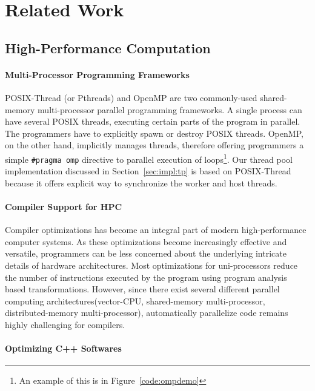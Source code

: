 \section{Related Work}

\subsection{High-Performance Computation}
\label{sec:hpc}

\paragraph{Multi-Processor Programming Frameworks} POSIX-Thread\citep{pthread}
(or Pthreads) and OpenMP\citep{openmp} are two commonly-used shared-memory 
multi-processor parallel programming frameworks.  A single process can have 
several POSIX threads, executing certain parts of the program in 
parallel. The programmers have to explicitly spawn or destroy POSIX threads.
OpenMP, on the other hand, implicitly manages threads, therefore
offering programmers a simple \texttt{\#pragma omp} directive to parallel execution of 
loops\footnote{An example of this is in Figure~\ref{code:ompdemo}}.
Our thread pool implementation discussed in Section~\ref{sec:impl:tp}
is based on POSIX-Thread because it offers explicit way to 
synchronize the worker and host threads.

\paragraph{Compiler Support for HPC} Compiler optimizations  has become an
integral part of modern high-performance computer systems. As these 
optimizations become increasingly effective and versatile, programmers
can be less concerned about the underlying intricate details of hardware
architectures. Most optimizations for uni-processors reduce the number of
instructions executed by the program using program analysis based 
transformations\citep{compiler-for-hpc}. However, since there exist several
different parallel computing architectures(vector-CPU, shared-memory
multi-processor, distributed-memory multi-processor), automatically 
parallelize code remains highly challenging for compilers.


\paragraph{Optimizing C++ Softwares}

